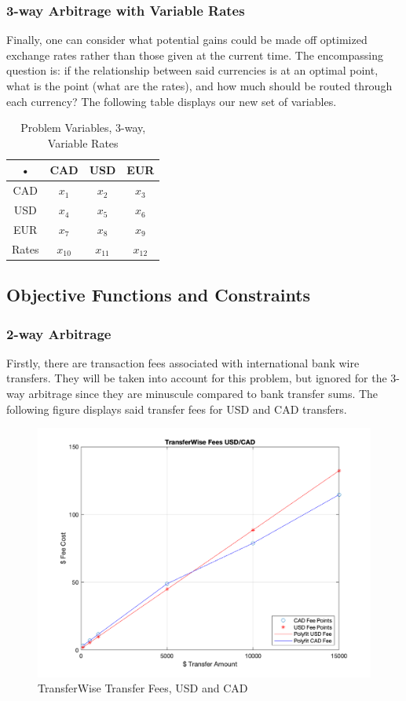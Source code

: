 \documentclass[12pt]{article}
\begin{document}
\subsubsection{3-way Arbitrage with Variable Rates}
Finally, one can consider what potential gains could be made off optimized exchange rates rather than those given at the current time. The encompassing question is: if the relationship between said currencies is at an optimal point, what is the point (what are the rates), and how much should be routed through each currency? The following table displays our new set of variables.
\begin{table}[H]
\centering
\begin{tabular}{|c|c|c|c|}
\hline 
• & CAD & USD & EUR \\ 
\hline 
CAD & $x_{1}$ & $x_{2}$ & $x_{3}$ \\ 
\hline 
USD & $x_{4}$ & $x_{5}$ & $x_{6}$ \\ 
\hline 
EUR & $x_{7}$ & $x_{8}$ & $x_{9}$ \\ 
\hline 
Rates & $x_{10}$ & $x_{11}$ & $x_{12}$ \\ 
\hline 
\end{tabular} 
\caption{Problem Variables, 3-way, Variable Rates}
\end{table}


\subsection{Objective Functions and Constraints}
\subsubsection{2-way Arbitrage}
Firstly, there are transaction fees associated with international bank wire transfers. They will be taken into account for this problem, but ignored for the 3-way arbitrage since they are minuscule compared to bank transfer sums. The following figure displays said transfer fees for USD and CAD transfers.
\begin{figure}[H]
    \centering
    \includegraphics[width=.9\linewidth]{figures/fees.png}
    \caption{TransferWise Transfer Fees, USD and CAD \cite{tw}}
    \label{fig:tw}
\end{figure}
\end{document}
